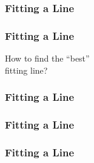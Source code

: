 \documentclass[12pt]{beamer}\usepackage[]{graphicx}\usepackage[]{color}
\begin{document}

\begin{frame}
\begin{center}
\Huge{}
\end{center}
\end{frame}


\begin{frame}
\frametitle{Fitting a Line}
\begin{center}
\end{center}
\end{frame}


\begin{frame}
\frametitle{Fitting a Line}
\begin{center}
\end{center}
\end{frame}


\begin{frame}
\begin{center}
{\Large How to find the ``best'' \\ fitting line?}
\end{center}
\end{frame}


\begin{frame}
\frametitle{Fitting a Line}
\begin{center}
\end{center}
\end{frame}


\begin{frame}
\frametitle{Fitting a Line}
\begin{center}
\end{center}
\end{frame}


\begin{frame}
\frametitle{Fitting a Line}
\begin{center}
\end{center}
\end{frame}
\end{document}

